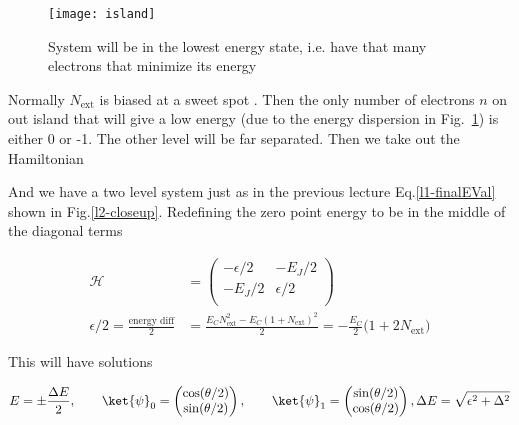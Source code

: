 \begin{figure}[h]
  \centering \texttt{[image: island]}
  \caption{\small  System will  be  in the  lowest  energy  state, i.e.   have  that many  electrons  that minimize  its
    energy\label{fig:cp_box_energy_charge}}
\end{figure}

\noindent

\noindent Normally  $ N_\text{ext}  $ is  biased at a  sweet spot  . Then  the only  number of
electrons   $n$   on   out   island   that   will   give   a   low   energy   (due   to   the   energy   dispersion   in
Fig.~\ref{fig:cp_box_energy_charge}) is either  0 or -1.  The  other level will be  far separated. Then we  take out the
Hamiltonian


\noindent  And  we  have  a  two  level  system  just as  in  the  previous  lecture  Eq.\eqref{l1-finalEVal}  shown  in
Fig.\ref{l2-closeup}. Redefining the zero point energy to be in the middle of the diagonal terms

\begin{equation}
  \begin{aligned}
    \mathcal{H} & = \begin{pmatrix}
      -\epsilon/2 & -E_J/2\\
      -E_J/2 & \epsilon/2\\
    \end{pmatrix}\\
    \epsilon/2    =   \frac{\text{energy    diff}}{2}    &    =   \frac{E_CN_\text{ext}^2-E_C(1+N_\text{ext})^2}{2}    =
    -\frac{E_C}{2}\big(1+2N_\text{ext}\big)
  \end{aligned}
\end{equation}

\begin{framed}\noindent
  This will have solutions

   \begin{equation}
     E = \pm \frac{\Delta E}{2}, \qquad \ket{\psi}_0 = \begin{pmatrix}
       \cos(\theta/2) \\ \sin(\theta/2)
     \end{pmatrix}, \qquad \ket{\psi}_1 = \begin{pmatrix} \sin(\theta/2) \\ \cos(\theta/2)
     \end{pmatrix}, \Delta E = \sqrt{\epsilon^2+\Delta^2}
   \end{equation}
 \end{framed}

